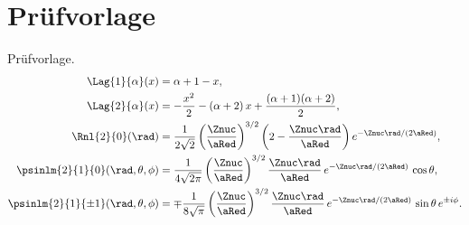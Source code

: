 \chapter{Prüfvorlage}\label{c11}

Prüfvorlage.
\begin{align}
  \Lag{1}{\alpha}(x) &= \alpha + 1 - x,
    \label{c11.eq.lag1} \\
  \Lag{2}{\alpha}(x) &= -\frac{x^2}{2} - (\alpha + 2)\,x + \frac{(\alpha + 1)(\alpha + 2)}{2},
    \label{c11.eq.lag2} \\
  \Rnl{2}{0}(\rad) &= \frac{1}{2\sqrt{2}}\left(\frac{\Znuc}{\aRed}\right)^{3/2}\left(2 - \frac{\Znuc\rad}{\aRed}\right) e^{-\Znuc\rad/(2\aRed)},
    \label{c11.eq.r20} \\
  \psinlm{2}{1}{0}(\rad, \theta, \phi) &= \frac{1}{4\sqrt{2\pi}}\left(\frac{\Znuc}{\aRed}\right)^{3/2}\frac{\Znuc\rad}{\aRed}\,e^{-\Znuc\rad/(2\aRed)}\,\cos\theta,
    \label{c11.eq.psi210} \\
  \psinlm{2}{1}{\pm 1}(\rad, \theta, \phi) &= \mp\frac{1}{8\sqrt{\pi}}\left(\frac{\Znuc}{\aRed}\right)^{3/2}\frac{\Znuc\rad}{\aRed}\,e^{-\Znuc\rad/(2\aRed)}\,\sin\theta\,e^{\pm i\phi}.
    \label{c11.eq.psi21pm}
\end{align}
